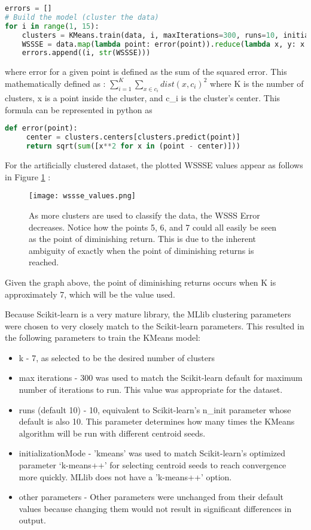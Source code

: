 \documentclass[9pt,twocolumn,twoside]{idsi}
\begin{document}
\begin{lstlisting}[language=Python, breaklines=true]
errors = []
# Build the model (cluster the data)
for i in range(1, 15):
    clusters = KMeans.train(data, i, maxIterations=300, runs=10, initializationMode="k-means")
    WSSSE = data.map(lambda point: error(point)).reduce(lambda x, y: x + y)
    errors.append((i, str(WSSSE)))
\end{lstlisting}
where error for a given point is defined as the sum of the squared error. This mathematically defined as : $\sum_{i=1}^{K} \sum_{x \in c_i} dist(x, c_i)^2 $ where K is the number of clusters, x is a point inside the cluster, and c\_i is the cluster's center. This formula can be represented in python as 
\begin{lstlisting}[language=Python, breaklines=true]
 def error(point):
     center = clusters.centers[clusters.predict(point)]
     return sqrt(sum([x**2 for x in (point - center)]))
\end{lstlisting}

For the artificially clustered dataset, the plotted WSSSE values appear as follows in Figure \ref{fig:wssse} : 
\begin{figure}[htbp]
\centering
\texttt{[image: wssse\_values.png]}
\caption{As more clusters are used to classify the data, the WSSS Error decreases. Notice how the points 5, 6, and 7 could all easily be seen as the point of diminishing return. This is due to the inherent ambiguity of exactly when the point of diminishing returns is reached.}
\label{fig:wssse}
\end{figure}

Given the graph above, the point of diminishing returns occurs when K is approximately 7, which will be the value used.

Because Scikit-learn is a very mature library, the MLlib clustering parameters were chosen to very closely match to the Scikit-learn parameters. This resulted in the following parameters to train the KMeans model: 
\begin{itemize}
	\item k - 7, as selected to be the desired number of clusters
	\item max iterations - 300 was used to match the Scikit-learn default for maximum number of iterations to run. This value was appropriate for the dataset.
   	\item runs (default 10) - 10, equivalent to Scikit-learn's n\_init parameter whose default is also 10. This parameter determines how many times the KMeans algorithm will be run with different centroid seeds. 
	\item initializationMode - 'kmeans' was used to match Scikit-learn's optimized parameter ‘k-means++' for selecting centroid seeds to reach convergence more quickly. MLlib does not have a 'k-means++' option.
    \item other parameters - Other parameters were unchanged from their default values because changing them would not result in significant differences in output. 
\end{itemize}
\end{document}
